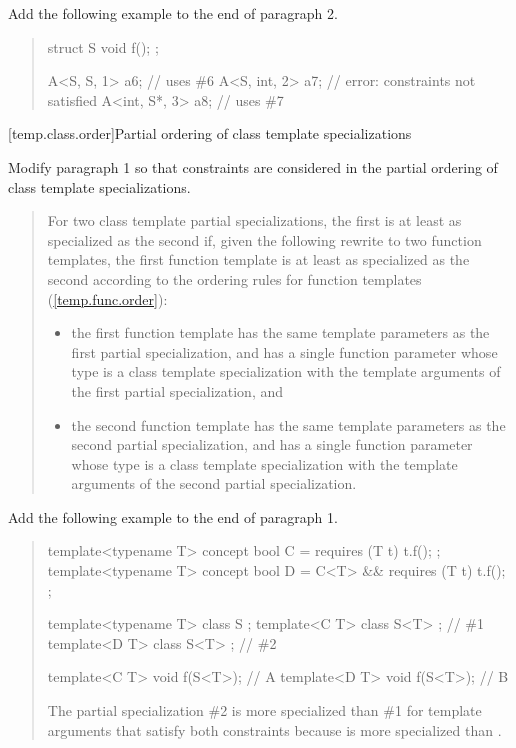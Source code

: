Add the following example to the end of paragraph 2.

\begin{quote}
\begin{addedblock}
\enterexample
\begin{codeblock}
struct S { void f(); };

A<S, S, 1>    a6; // uses \#6
A<S, int, 2>  a7; // error: constraints not satisfied
A<int, S*, 3> a8; // uses \#7
\end{codeblock}
\exitexample
\end{addedblock}
\end{quote}


[temp.class.order]{Partial ordering of class template specializations}

Modify paragraph 1 so that constraints are considered in the
partial ordering of class template specializations. 

\begin{quote}
\pnum
For two class template partial specializations, the first is 
at least as specialized as the second if, given the following 
rewrite to two function templates, the first function template 
is at least as specialized as the second according to the ordering 
rules for function templates 
(\ref{temp.func.order}):
% 
\begin{itemize}
\item the first function template has the same template 
parameters  as the first partial 
specialization, and has a single function parameter whose
type is a class template specialization with the template 
arguments of the first partial specialization, and

\item the second function template has the same template 
parameters  as the second partial 
specialization, and has a single function parameter whose
type is a class template specialization with the template 
arguments of the second partial specialization.
\end{itemize}
\end{quote}

Add the following example to the end of paragraph 1.

\begin{quote}
\begin{addedblock}
\enterexample
\begin{codeblock}
template<typename T> concept bool C = requires (T t) { t.f(); };
template<typename T> concept bool D = C<T> && requires (T t) { t.f(); };


template<typename T> class S { };
template<C T> class S<T> { }; // \#1
template<D T> class S<T> { }; // \#2

template<C T> void f(S<T>); // A
template<D T> void f(S<T>); // B
\end{codeblock}
The partial specialization \#2 is more specialized than 
\#1 for template arguments that satisfy both constraints because 
 is more specialized than .
\exitexample
\end{addedblock}
\end{quote}


